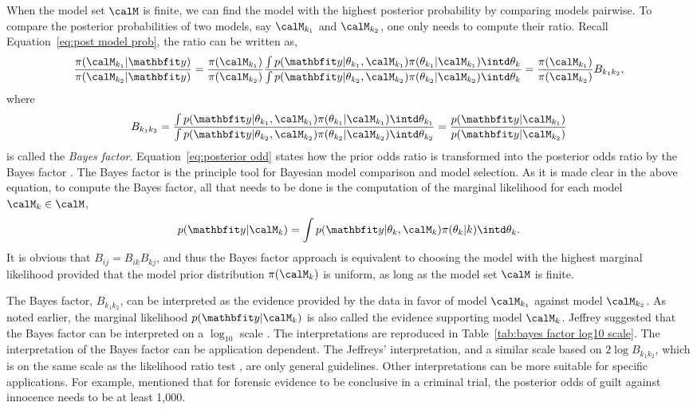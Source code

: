 When the model set $\calM$ is finite, we can find the model with the highest posterior probability by comparing models pairwise. To compare the posterior probabilities of two models, say $\calM_{k_1}$ and $\calM_{k_2}$, one only needs to compute their ratio. Recall Equation~\eqref{eq:post model prob}, the ratio can be written as,
\begin{equation}
  \frac{\pi(\calM_{k_1}|\data)}{\pi(\calM_{k_2}|\data)}
  = \frac{\pi(\calM_{k_1})}{\pi(\calM_{k_2})} \frac
  {\int p(\data|\theta_{k_1},\calM_{k_1})\pi(\theta_{k_1}|\calM_{k_1})
      \intd\theta_k}
  {\int p(\data|\theta_{k_2},\calM_{k_2})\pi(\theta_{k_2}|\calM_{k_2})
      \intd\theta_k}
  = \frac{\pi(\calM_{k_1})}{\pi(\calM_{k_2})}B_{k_1k_2},
  \label{eq:posterior odd}
\end{equation}
where
\begin{equation}
  B_{k_1k_2} = \frac
  {\int p(\data|\theta_{k_1},\calM_{k_1})\pi(\theta_{k_1}|\calM_{k_1})
      \intd\theta_{k_1}}
  {\int p(\data|\theta_{k_2},\calM_{k_2})\pi(\theta_{k_2}|\calM_{k_2})
      \intd\theta_{k_2}}
    = \frac{p(\data|\calM_{k_1})}{p(\data|\calM_{k_2})}
  \label{eq:bayes factor}
\end{equation}
is called the \emph{Bayes factor}. Equation~\eqref{eq:posterior odd} states how the prior odds ratio is transformed into the posterior odds ratio by the Bayes factor \cite{Kass:1995vb}. The Bayes factor is the principle tool for Bayesian model comparison and model selection. As it is made clear in the above equation, to compute the Bayes factor, all that needs to be done is the computation of the marginal likelihood for each model $\calM_k\in\calM$,
\begin{equation*}
  p(\data|\calM_k) =
  \int p(\data|\theta_k,\calM_k)\pi(\theta_k|k)\intd\theta_k.
\end{equation*}
It is obvious that $B_{ij} = B_{ik}B_{kj}$, and thus the Bayes factor approach is equivalent to choosing the model with the highest marginal likelihood provided that the model prior distribution $\pi(\calM_k)$ is uniform, as long as the model set $\calM$ is finite.

The Bayes factor, $B_{k_1k_2}$, can be interpreted as the evidence provided by the data in favor of model $\calM_{k_1}$ against model $\calM_{k_2}$. As noted earlier, the marginal likelihood $p(\data|\calM_k)$ is also called the evidence supporting model $\calM_k$. Jeffrey suggested that the Bayes factor can be interpreted on a $\log_{10}$ scale \cite{Jeffreys:1961ua}. The interpretations are reproduced in Table~\ref{tab:bayes factor log10 scale}. The interpretation of the Bayes factor can be application dependent. The Jeffreys' interpretation, and a similar scale based on $2\log B_{k_1k_2}$, which is on the same scale as the likelihood ratio test \cite{Kass:1995vb}, are only general guidelines. Other interpretations can be more suitable for specific applications. For example, \cite{Kass:1995vb} mentioned that for forensic evidence to be conclusive in a criminal trial, the posterior odds of guilt against innocence needs to be at least 1,000.

